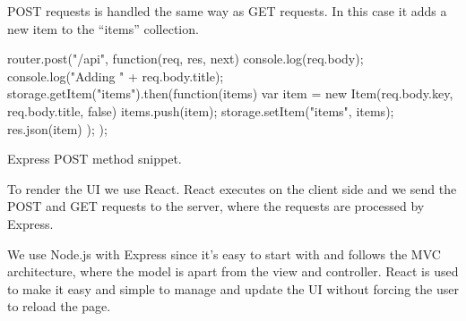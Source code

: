 POST requests is handled the same way as GET requests. 
In this case it adds a new item to the ``items'' collection.

\begin{listing}
    \begin{js}
        router.post("/api", function(req, res, next) {
            console.log(req.body);
            console.log("Adding " + req.body.title);
            storage.getItem("items").then(function(items) {
                var item = new Item(req.body.key, req.body.title, false)
                items.push(item);
                storage.setItem("items", items);
                res.json(item)
            });
        });
    \end{js}
    \caption{Express POST method snippet.}
    \label{lst:express_post}
\end{listing}

To render the UI we use React.
React executes on the client side and we send the POST and GET requests to the server, where the requests are processed by Express.

We use Node.js with Express since it's easy to start with and follows the MVC architecture, where the model is apart from the view and controller.
React is used to make it easy and simple to manage and update the UI without forcing the user to reload the page. 
